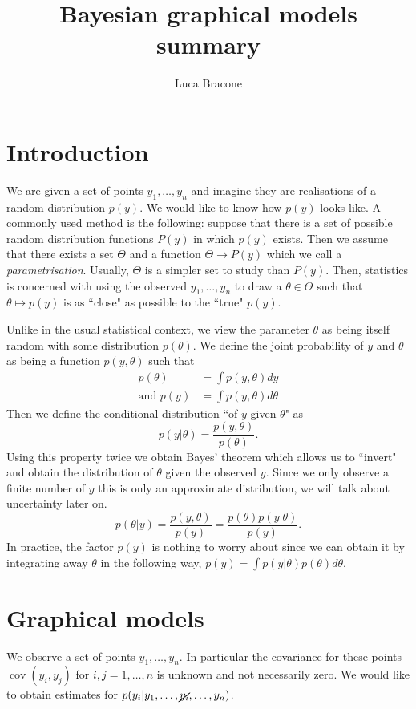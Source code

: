 \documentclass{scrartcl}
\author{Luca Bracone}
\title{Bayesian graphical models summary}
\DeclareMathOperator{\cov}{cov}
\begin{document}
\maketitle
\section{Introduction}
We are given a set of points $y_1, \dots, y_n$ and imagine they are
realisations of a random distribution $p(y)$.
We would like to know how $p(y)$ looks like.
A commonly used method is the following: suppose that there is a set of
possible random distribution functions $P(y)$ in which $p(y)$ exists.
Then we assume that there exists a set $\Theta$ and a function $\Theta \to P(y)$
which we call a \emph{parametrisation}.
Usually, $\Theta$ is a simpler set to study than $P(y)$.
Then, statistics is concerned with using the observed $y_1,\dots,y_n$ to draw a
$\theta \in \Theta$ such that $\theta \mapsto p(y)$ is as ``close" as possible
to the ``true" $p(y)$.

Unlike in the usual statistical context, we view the parameter $\theta$ as
being itself random with some distribution $p(\theta)$. We define the joint
probability of $y$ and $\theta$ as being a function $p(y,\theta)$ such that
\begin{align*}
	p(\theta)        & = \int p(y,\theta) dy      \\
	\text{and } p(y) & = \int p(y,\theta) d\theta
\end{align*}
Then we define the conditional distribution ``of $y$ given $\theta$" as
\[
	p(y|\theta) = \frac{p(y,\theta)}{p(\theta)}.
\]
Using this property twice we obtain Bayes' theorem which allows us to ``invert"
and obtain the distribution of $\theta$ given the observed $y$. Since we only
observe a finite number of $y$ this is only an approximate distribution, we
will talk about uncertainty later on.
\[
	p(\theta|y) = \frac{p(y,\theta)}{p(y)} = \frac{p(\theta)p(y|\theta)}{p(y)}.
\]
In practice, the factor $p(y)$ is nothing to worry about since we can obtain it
by integrating away $\theta$ in the following way, $p(y) = \int
	p(y|\theta)p(\theta)d\theta$.

\section{Graphical models}
We observe a set of points $y_1, \dots, y_n$.
In particular the covariance for these points $\cov(y_i, y_j)$ for $i,j = 1,\dots,
	n$ is unknown and not necessarily zero.
We would like to obtain estimates for $p(y_i | y_1,\dots, \cancel{y_i},\dots, y_n)$.
\end{document}
